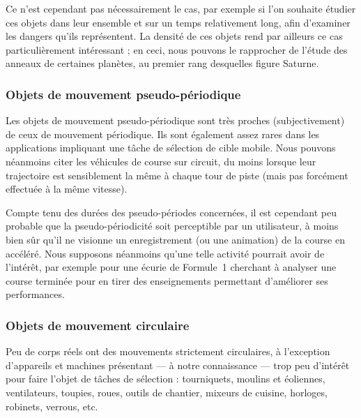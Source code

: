 	Ce n'est cependant pas nécessairement le cas, par exemple si l'on souhaite étudier ces objets dans leur ensemble et sur un temps relativement long, afin d'examiner les dangers qu'ils représentent. La densité de ces objets rend par ailleurs ce cas particulièrement intéressant ; en ceci, nous pouvons le rapprocher de l'étude des anneaux de certaines planètes, au premier rang desquelles figure Saturne\footnotemark{}.
	
	
	\subsubsection{Objets de mouvement pseudo-périodique}
	Les objets de mouvement pseudo-périodique sont très proches (subjectivement) de ceux de mouvement périodique. Ils sont également assez rares dans les applications impliquant une tâche de sélection de cible mobile. Nous pouvons néanmoins citer les véhicules de course sur circuit, du moins lorsque leur trajectoire est sensiblement la même à chaque tour de piste (mais pas forcément effectuée à la même vitesse).
	
	Compte tenu des durées des pseudo-périodes concernées, il est cependant peu probable que la pseudo-périodicité soit perceptible par un utilisateur, à moins bien sûr qu'il ne visionne un enregistrement (ou une animation) de la course en accéléré. Nous supposons néanmoins qu'une telle activité pourrait avoir de l'intérêt, par exemple pour une écurie de Formule~1 cherchant à analyser une course terminée pour en tirer des enseignements permettant d'améliorer ses performances.
	
	\subsubsection{Objets de mouvement circulaire}
	Peu de corps réels ont des mouvements strictement circulaires, à l'exception d'appareils et machines présentant --- à notre connaissance --- trop peu d'intérêt pour faire l'objet de tâches de sélection : tourniquets, moulins et éoliennes, ventilateurs, toupies, roues, outils de chantier, mixeurs de cuisine, horloges, robinets, verrous, etc.
	
